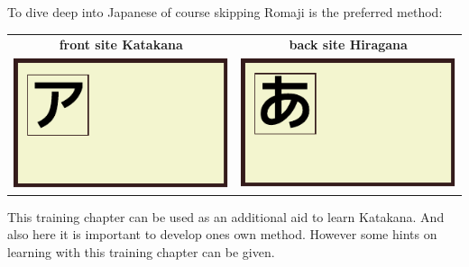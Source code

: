 To dive deep into Japanese of course skipping Romaji is the preferred method:

\begin{center}
\begin{tabular}{cc}
\textbf{front site Katakana}&\textbf{back site Hiragana}\\
\includegraphics[scale=1.5]{../share/i/fcak.pdf}%
&
\includegraphics[scale=1.5]{../share/i/fcah.pdf}%
\\
\end{tabular}
\end{center}

This training chapter can be used as an additional aid to learn Katakana. And
also here it is important to develop ones own method. However some hints on
learning with this training chapter can be given.

